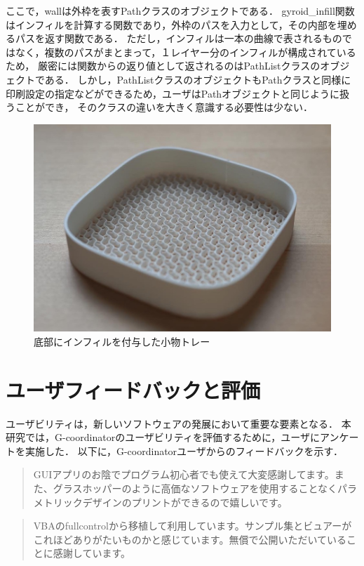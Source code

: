 \documentclass{article}
\begin{document}
\begin{twocolumn}
ここで，wallは外枠を表すPathクラスのオブジェクトである．
gyroid\_infill関数はインフィルを計算する関数であり，外枠のパスを入力として，その内部を埋めるパスを返す関数である．
ただし，インフィルは一本の曲線で表されるものではなく，複数のパスがまとまって，１レイヤー分のインフィルが構成されているため，
厳密には関数からの返り値として返されるのはPathListクラスのオブジェクトである．
しかし，PathListクラスのオブジェクトもPathクラスと同様に印刷設定の指定などができるため，ユーザはPathオブジェクトと同じように扱うことができ，
そのクラスの違いを大きく意識する必要性は少ない．
\begin{figure}[htbp]
  \includegraphics[width=\linewidth]{img/infill_case.JPG}
  \caption{底部にインフィルを付与した小物トレー}
  \label{fig:infill}
\end{figure}

\section{ユーザフィードバックと評価}
ユーザビリティは，新しいソフトウェアの発展において重要な要素となる．
本研究では，G-coordinatorのユーザビリティを評価するために，ユーザにアンケートを実施した．
以下に，G-coordinatorユーザからのフィードバックを示す．
\begin{quote}
  GUIアプリのお陰でプログラム初心者でも使えて大変感謝してます。また、グラスホッパーのように高価なソフトウェアを使用することなくパラメトリックデザインのプリントができるので嬉しいです。
\end{quote}

\begin{quote}
  VBAのfullcontrolから移植して利用しています。サンプル集とビュアーがこれほどありがたいものかと感じています。無償で公開いただいていることに感謝しています。
\end{quote}


\end{twocolumn}
\end{document}
